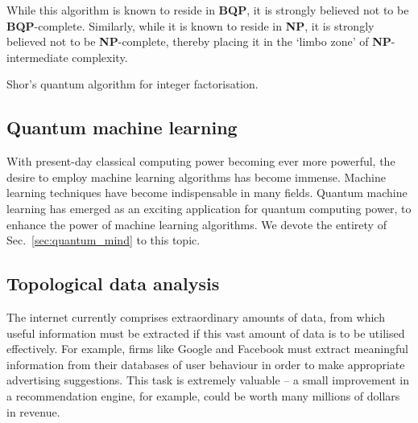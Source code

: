 While this algorithm is known to reside in \textbf{BQP}, it is strongly believed not to be \textbf{BQP}-complete. Similarly, while it is known to reside in \textbf{NP}, it is strongly believed not to be \textbf{NP}-complete, thereby placing it in the `limbo zone' of \textbf{NP}-intermediate complexity.

\begin{table}[!htbp]
\captionspacealg \caption{Shor's quantum algorithm for integer factorisation.} \label{alg:shor}
\end{table}

%
%

\subsection{Quantum machine learning} 

With present-day classical computing power becoming ever more powerful, the desire to employ machine learning algorithms has become immense. Machine learning techniques have become indispensable in many fields. Quantum machine learning has emerged as an exciting application for quantum computing power, to enhance the power of machine learning algorithms. We devote the entirety of Sec.~\ref{sec:quantum_mind} to this topic.

%
%

\subsection{Topological data analysis} \label{sec:TDA}

The internet currently comprises extraordinary amounts of data, from which useful information must be extracted if this vast amount of data is to be utilised effectively. For example, firms like Google and Facebook must extract meaningful information from their databases of user behaviour in order to make appropriate advertising suggestions. This task is extremely valuable -- a small improvement in a recommendation engine, for example, could be worth many millions of dollars in revenue.

